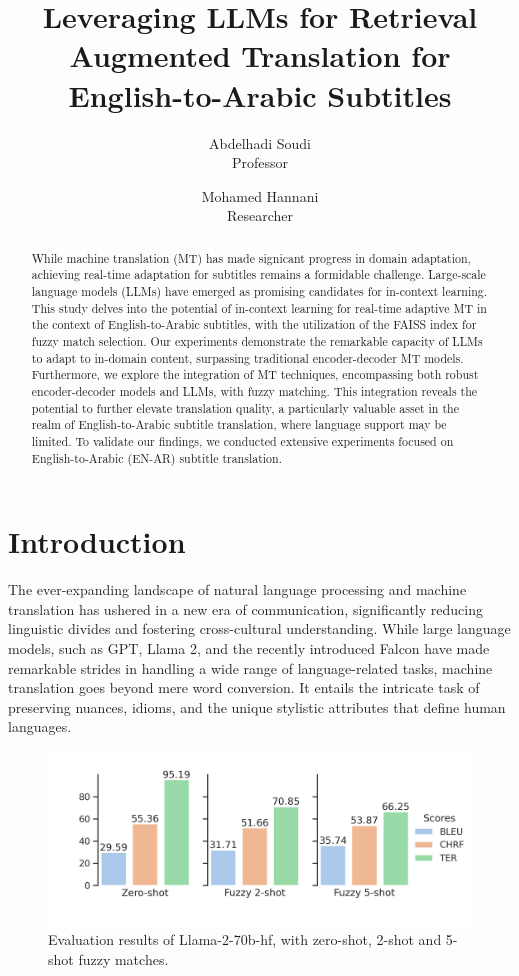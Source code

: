 \documentclass[twocolumn]{article}
\title{Leveraging LLMs for Retrieval Augmented Translation for English-to-Arabic Subtitles}
\author{
Abdelhadi Soudi \\
Professor
\and
Mohamed Hannani \\
Researcher
}
\date{}  %
\begin{document}
\maketitle

\begin{abstract}
While machine translation (MT) has made signicant progress in domain adaptation, achieving real-time adaptation for subtitles remains a formidable challenge. Large-scale language models (LLMs) have emerged as promising candidates for in-context learning. This study delves into the potential of in-context learning for real-time adaptive MT in the context of English-to-Arabic subtitles, with the utilization of the FAISS index for fuzzy match selection. Our experiments demonstrate the remarkable capacity of LLMs to adapt to in-domain content, surpassing traditional encoder-decoder MT models. Furthermore, we explore the integration of MT techniques, encompassing both robust encoder-decoder models and LLMs, with fuzzy matching. This integration reveals the potential to further elevate translation quality, a particularly valuable asset in the realm of English-to-Arabic subtitle translation, where language support may be limited. To validate our findings, we conducted extensive experiments focused on English-to-Arabic (EN-AR) subtitle translation.

\end{abstract}
%
\section{Introduction}\label{sec:introduction}

The ever-expanding landscape of natural language processing and machine translation has ushered in a new era of communication, significantly reducing linguistic divides and fostering cross-cultural understanding. While large language models, such as GPT, Llama 2, and the recently introduced Falcon have made remarkable strides in handling a wide range of language-related tasks, machine translation goes beyond mere word conversion. It entails the intricate task of preserving nuances, idioms, and the unique stylistic attributes that define human languages.

\begin{figure}
\centering
\includegraphics[width=\linewidth, ]{figs/Llama2_evaluation} %
\caption{ Evaluation results of Llama-2-70b-hf, with zero-shot, 2-shot and 5-shot fuzzy matches.}

\label{llama_2_evaluation:duck}
\end{figure}
\end{document}
